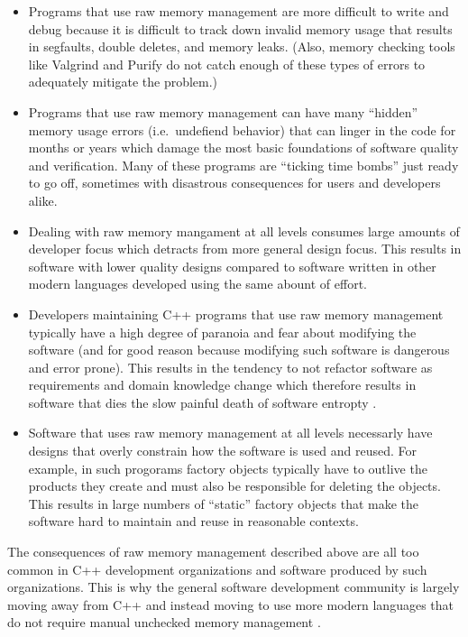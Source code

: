 \documentclass[pdf,ps2pdf,11pt]{SANDreport}
\begin{document}
\begin{itemize}

{}\item Programs that use raw memory management are more difficult to
write and debug because it is difficult to track down invalid memory
usage that results in segfaults, double deletes, and memory leaks.
(Also, memory checking tools like Valgrind and Purify do not catch
enough of these types of errors to adequately mitigate the problem.)

{}\item Programs that use raw memory management can have many
``hidden'' memory usage errors (i.e.\ undefiend behavior) that can
linger in the code for months or years which damage the most basic
foundations of software quality and verification.  Many of these
programs are ``ticking time bombs'' just ready to go off, sometimes
with disastrous consequences for users and developers alike.

{}\item Dealing with raw memory mangament at all levels consumes large
amounts of developer focus which detracts from more general design
focus.  This results in software with lower quality designs compared
to software written in other modern languages developed using the same
abount of effort.

{}\item Developers maintaining C++ programs that use raw memory
management typically have a high degree of paranoia and fear about
modifying the software (and for good reason because modifying such
software is dangerous and error prone).  This results in the tendency
to not refactor software as requirements and domain knowledge change
{}\cite{DomainDrivenDesign} which therefore results in software that
dies the slow painful death of software entropty
{}\cite{MythicalManMonth95}.

{}\item Software that uses raw memory management at all levels
necessarly have designs that overly constrain how the software is used
and reused.  For example, in such progorams factory objects typically
have to outlive the products they create and must also be responsible
for deleting the objects.  This results in large numbers of ``static''
factory objects that make the software hard to maintain and reuse in
reasonable contexts.

\end{itemize}

The consequences of raw memory management described above are all too
common in C++ development organizations and software produced by such
organizations.  This is why the general software development community
is largely moving away from C++ and instead moving to use more modern
languages that do not require manual unchecked memory management
{}\cite{DomainDrivenDesignQuickly}.
\end{document}

